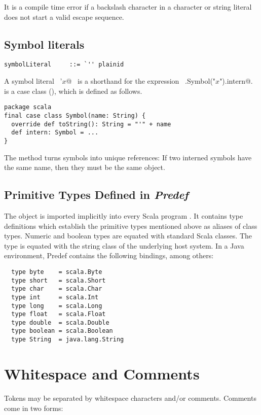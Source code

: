 It is a compile time error if a backslash character in a character or
string literal does not start a valid escape sequence.

\subsection{Symbol literals}

\syntax\begin{lstlisting}
symbolLiteral     ::= `'' plainid
\end{lstlisting}

A symbol literal ~\lstinline@'$x$@~ is a shorthand for the expression
~\lstinline@scala.Symbol("$x$").intern@. \lstinline@Symbol@ is a case class
(), which is defined as follows.
\begin{lstlisting}
package scala
final case class Symbol(name: String) {
  override def toString(): String = "'" + name
  def intern: Symbol = ...
}
\end{lstlisting}
The \lstinline@intern@ method turns symbols into unique references: If
two interned symbols have the same name, then they must be the same
object.

\subsection{Primitive Types Defined in {\em Predef}}

The object \lstinline@Predef@ is imported implicitly into every Scala
program . It contains type definitions which establish the primitive
types mentioned above as aliases of class types. Numeric and boolean
types are equated with standard Scala classes. The \lstinline@String@
type is equated with the string class of the underlying host
system. In a Java environment, Predef contains the following bindings,
among others:
\begin{lstlisting}
  type byte    = scala.Byte
  type short   = scala.Short
  type char    = scala.Char
  type int     = scala.Int
  type long    = scala.Long
  type float   = scala.Float
  type double  = scala.Double
  type boolean = scala.Boolean
  type String  = java.lang.String
\end{lstlisting}

\section{Whitespace and Comments}

Tokens may be separated by whitespace characters
and/or comments. Comments come in two forms:

